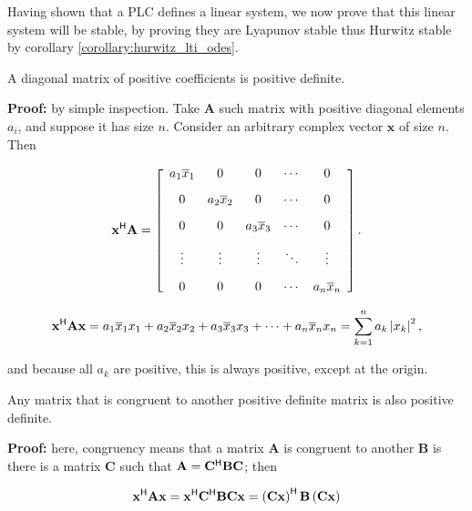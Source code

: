 	Having shown that a PLC defines a linear system, we now prove that this linear system will be stable, by proving they are Lyapunov stable thus Hurwitz stable by corollary \ref{corollary:hurwitz_lti_odes}.

\begin{lemma}\label{lemma:positive_def_diag} A diagonal matrix of positive coefficients is positive definite. \end{lemma}
\noindent\textbf{Proof:} by simple inspection. Take $\mathbf{A}$ such matrix with positive diagonal elements $a_i$, and suppose it has size $n$. Consider an arbitrary complex vector $\mathbf{x}$ of size $n$. Then

\begin{equation} \mathbf{x}^{\mathsf{H}} \mathbf{A} = \left[\begin{array}{ccccc} a_1\overline{x}_1 & 0 & 0 & \cdots & 0\\[3mm] 0 & a_2\overline{x}_2 & 0 & \cdots & 0 \\[3mm]  0 & 0 & a_3\overline{x}_3 & \cdots & 0\\[3mm] \vdots & \vdots & \vdots & \ddots & \vdots \\[3mm] 0 & 0 & 0 & \cdots & a_n\overline{x}_n \end{array}\right]. \end{equation}

\begin{equation} \mathbf{x}^{\mathsf{H}} \mathbf{Ax} =  a_1\overline{x}_1x_1 + a_2\overline{x}_2x_2 + a_3\overline{x}_3x_3 + \cdots +  a_n\overline{x}_nx_n = \sum_{k=1}^n a_k \left\lvert x_k\right\rvert^2 , \end{equation}

	\noindent and because all $a_k$ are positive, this is always positive, except at the origin.
\begin{lemma} \label{lemma:positive_def_congruent} Any matrix that is congruent to another positive definite matrix is also positive definite. \end{lemma}
\noindent\textbf{Proof:} here, congruency means that a matrix $\mathbf{A}$ is congruent to another $\mathbf{B}$ is there is a matrix $\mathbf{C}$ such that $\mathbf{A} = \mathbf{C}^{\mathsf{H}}\mathbf{BC}$; then

\begin{equation} \mathbf{x}^{\mathsf{H}}\mathbf{Ax} = \mathbf{x}^{\mathsf{H}}\mathbf{C}^{\mathsf{H}}\mathbf{BCx} = \left(\mathbf{Cx}\right)^{\mathsf{H}}\mathbf{B}\left(\mathbf{Cx}\right) \end{equation}

